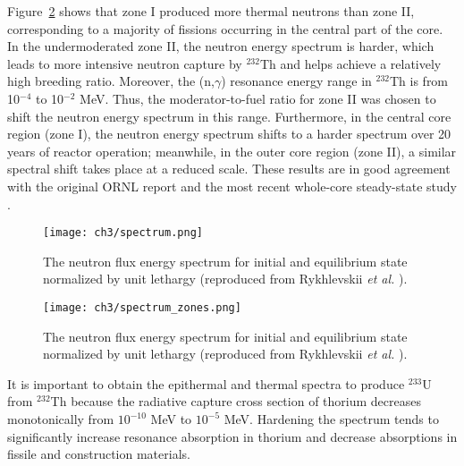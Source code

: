 Figure~\ref{fig:spectrum_zones} shows that zone I produced more thermal  
neutrons than zone II, corresponding to a majority of fissions occurring in 
the central part of the core. In the undermoderated zone II, the neutron 
energy spectrum is harder, which leads to more intensive neutron capture by 
$^{232}$Th and helps achieve a relatively high breeding ratio. Moreover, the 
(n,$\gamma$) resonance energy range in $^{232}$Th is from 10$^{-4}$ to 
10$^{-2}$ MeV. Thus, the moderator-to-fuel ratio for zone II was chosen 
to shift the neutron energy spectrum in this range. Furthermore, in the 
central core region (zone I), the neutron energy spectrum shifts to a harder 
spectrum over 20 years of reactor operation; meanwhile, in the outer core 
region (zone II), a similar spectral shift takes place at a reduced scale. 
These results are in good agreement with the original ORNL report 
\cite{robertson_conceptual_1971} and the most recent whole-core steady-state 
study \cite{park_whole_2015}.
\begin{figure}[htp!] %
	\centering
	\texttt{[image: ch3/spectrum.png]}
	\caption{The neutron flux energy spectrum for initial and equilibrium  
	state normalized by unit lethargy (reproduced from Rykhlevskii 
	\emph{et al.} \cite{rykhlevskii_modeling_2019}).}
	\label{fig:spectrum}
\end{figure}
\begin{figure}[htp!] %
	\centering
	\texttt{[image: ch3/spectrum\_zones.png]} 
	\caption{The neutron flux energy spectrum for initial and equilibrium  
		state normalized by unit lethargy (reproduced from 
		Rykhlevskii \emph{et al.} \cite{rykhlevskii_modeling_2019}).}
	\label{fig:spectrum_zones}
\end{figure}

It is important to obtain the epithermal and thermal spectra to produce 
$^{233}$U from $^{232}$Th because the radiative capture cross section of 
thorium decreases monotonically from $10^{-10}$ MeV to $10^{-5}$ MeV. 
Hardening the spectrum tends to significantly increase resonance absorption in 
thorium and decrease absorptions in fissile and construction materials. 


